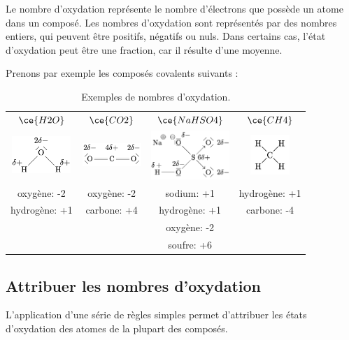 \documentclass[
  11pt,
  french,
  a4paper,
  openany]{book}
\begin{document}
Le nombre d'oxydation représente le nombre d'électrons que possède un atome dans un composé. Les nombres d'oxydation sont représentés par des nombres entiers, qui peuvent être positifs, négatifs ou nuls. Dans certains cas, l'état d'oxydation peut être une fraction, car il résulte d'une moyenne.

Prenons par exemple les composés covalents suivants :

\begin{longtable}[]{@{}cccc@{}}
\caption{\label{tab:tab-NO-examples} Exemples de nombres d'oxydation.}\tabularnewline
\toprule
\endhead
\(\ce{H2O}\) & \(\ce{CO2}\) & \(\ce{NaHSO4}\) & \(\ce{CH4}\)\tabularnewline
\includegraphics[width=6em,height=\textheight]{images/mol2D/H2O-charge.png} & \includegraphics[width=6em,height=\textheight]{images/mol2D/CO2-charge.png} & \includegraphics[width=8em,height=\textheight]{images/mol2D/NaHSO4-charge.png} & \includegraphics[width=4em,height=\textheight]{images/mol2D/CH4.jpg}\tabularnewline
oxygène: -2 & oxygène: -2 & sodium: +1 & hydrogène: +1\tabularnewline
hydrogène: +1 & carbone: +4 & hydrogène: +1 & carbone: -4\tabularnewline
& & oxygène: -2 &\tabularnewline
& & soufre: +6 &\tabularnewline
\bottomrule
\end{longtable}

\clearpage

\hypertarget{attribuer-les-nombres-doxydation}{%
\subsection{Attribuer les nombres d'oxydation}\label{attribuer-les-nombres-doxydation}}

L'application d'une série de règles simples permet d'attribuer les états d'oxydation des atomes de la plupart des composés.
\end{document}
